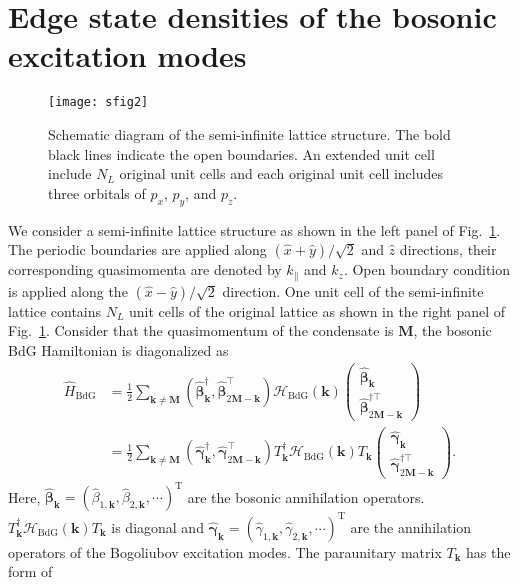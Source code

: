 \documentclass[aps,pra,floatfix,twocolumn,superscriptaddress]{revtex4-1}
\begin{document}
\section{Edge state densities of the bosonic excitation modes}
\label{appendixB}
\begin{figure}[htbp]
	\centering
	\texttt{[image: sfig2]}
	\caption{Schematic diagram of the semi-infinite lattice structure. The bold black lines indicate the open boundaries. An extended unit cell include $N_L$ original unit cells and each original unit cell includes three orbitals of $p_x$, $p_y$, and $p_z$.}
	\label{sfig2}
\end{figure}
We consider a semi-infinite lattice structure as shown in the left panel of Fig.~\ref{sfig2}. The periodic boundaries are applied along $(\hat{x}+\hat{y})/\sqrt{2}$ and $\hat{z}$ directions, their corresponding quasimomenta are denoted by $k_\parallel$ and $k_z$. Open boundary condition is applied along the $(\hat{x}-\hat{y})/\sqrt{2}$ direction. One unit cell of the semi-infinite lattice contains $N_L$ unit cells of the original lattice as shown in the right panel of Fig.~\ref{sfig2}. Consider that the quasimomentum of the condensate is $\mathbf{M}$, the bosonic BdG Hamiltonian is diagonalized as
\begin{equation}
	\begin{aligned}
		\hat{H}_{\mathrm{BdG}}&=\frac{1}{2}\sum_{\mathbf{k}\neq \mathbf{M}}
		\left(\hat{\boldsymbol{\beta}}_{\mathbf{k}}^{\dagger},\hat{\boldsymbol{\beta}}_{2\mathbf{M}-\mathbf{k}}^\top\right)
		\mathcal{H}_{\mathrm{BdG}}(\mathbf{k})
		\left(\begin{array}{c}
			\hat{\boldsymbol{\beta}}_{\mathbf{k}}\\
			\hat{\boldsymbol{\beta}}_{2\mathbf{M}-\mathbf{k}}^{\dagger\top}
		\end{array}\right)\\
		&=\frac{1}{2}\sum_{\mathbf{k}\neq \mathbf{M}}
		\left(\hat{\boldsymbol{\gamma}}_{\mathbf{k}}^{\dagger},\hat{\boldsymbol{\gamma}}_{2\mathbf{M}-\mathbf{k}}^\top\right)
		T_\mathbf{k}^\dagger\mathcal{H}_{\mathrm{BdG}}(\mathbf{k})T_\mathbf{k}
		\left(\begin{array}{c}
			\hat{\boldsymbol{\gamma}}_{\mathbf{k}}\\
			\hat{\boldsymbol{\gamma}}_{2\mathbf{M}-\mathbf{k}}^{\dagger\top}
		\end{array}\right).
	\end{aligned}
\end{equation}
Here, $\hat{\boldsymbol{\beta}}_{\mathbf{k}}=(\hat{\beta}_{1,\mathbf{k}},\hat{\beta}_{2,\mathbf{k}},\cdots)^\mathrm{T}$ are the bosonic annihilation operators. $T_\mathbf{k}^\dagger\mathcal{H}_{\mathrm{BdG}}(\mathbf{k})T_\mathbf{k}$ is diagonal and $\hat{\boldsymbol{\gamma}}_{\mathbf{k}}=(\hat{\gamma}_{1,\mathbf{k}},\hat{\gamma}_{2,\mathbf{k}},\cdots)^\mathrm{T}$ are the annihilation operators of the Bogoliubov excitation modes. The paraunitary matrix $T_\mathbf{k}$ has the form of
\end{document}
